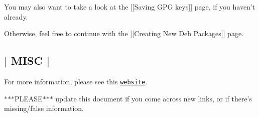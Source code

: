 You may also want to take a look at the \mbox{[}\mbox{[}Saving G\-P\-G keys\mbox{]}\mbox{]} page, if you haven't already.

Otherwise, feel free to continue with the \mbox{[}\mbox{[}Creating New Deb Packages\mbox{]}\mbox{]} page. 

 \subsection*{$\vert$ M\-I\-S\-C $\vert$ }

For more information, please see this \href{http://ubuntuforums.org/showthread.php?t=680292}{\tt website}.

$\ast$$\ast$$\ast$\-P\-L\-E\-A\-S\-E$\ast$$\ast$$\ast$ update this document if you come across new links, or if there's missing/false information. 